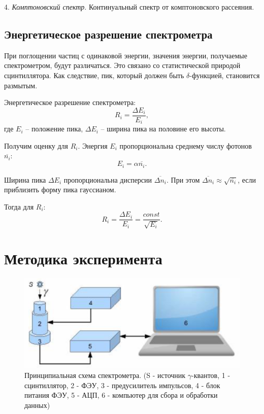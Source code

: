 \documentclass[12pt,a4paper]{article}
\begin{document}
	4. \textit{Комптоновский спектр}. Континуальный спектр от комптоновского рассеяния.
	
	\subsection*{Энергетическое разрешение спектрометра}
	
	При поглощении частиц с одинаковой энергии, значения энергии, получаемые спектрометром, будут различаться. Это связано со статистической природой сцинтиллятора. Как следствие, пик, который должен быть $\delta$-функцией, становится размытым.
	
	Энергетическое разрешение спектрометра:
	$$R_i = \frac{\Delta E_i}{E_i},$$
	где $E_i$ -- положение пика, $\Delta E_i$ -- ширина пика на половине его высоты.
	
	Получим оценку для $R_i$. Энергия $E_i$ пропорциональна среднему числу фотонов $\overline{n_i}$:
	$$E_i = \alpha \overline{n_i}.$$
	
	Ширина пика $\Delta E_i$ пропорциональна дисперсии $\overline{\Delta n_i}$. При этом $\overline{\Delta n_i} \approx \sqrt{\overline{n_i}}$, если приблизить форму пика гауссианом.
	
	Тогда для $R_i$:
	\begin{equation}
		R_i = \frac{\Delta E_i}{E_i} = \frac{const}{\sqrt{E_i}}.
		\label{eq:R_i}
	\end{equation}

	\section*{Методика эксперимента}

	\begin{figure}[H]
		\centering
		\includegraphics[scale=0.5]{res/scheme.png}
		\caption{\centering
				 Принципиальная схема спектрометра.
				 (S - источник $\gamma$-квантов, 1 - сцинтиллятор, 2 - ФЭУ, 3 - предусилитель импульсов, 4 - блок питания ФЭУ, 5 - АЦП, 6 - компьютер для сбора и обработки данных)}
		\label{fig:scheme}
	\end{figure}
	
\end{document}
